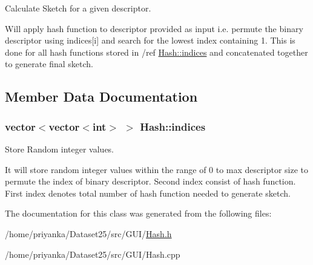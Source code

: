 \-Calculate \-Sketch for a given descriptor. 

\-Will apply hash function to descriptor provided as input i.\-e. permute the binary descriptor using indices\mbox{[}i\mbox{]} and search for the lowest index containing 1. \-This is done for all hash functions stored in /ref \hyperlink{classHash_a312855c01b7618ea56601216467354ee}{\-Hash\-::indices} and concatenated together to generate final sketch. 

\subsection{\-Member \-Data \-Documentation}
\hypertarget{classHash_a312855c01b7618ea56601216467354ee}{
\subsubsection[{indices}]{\setlength{\rightskip}{0pt plus 5cm}vector$<$vector$<$int$>$ $>$ {\bf \-Hash\-::indices}}}\label{classHash_a312855c01b7618ea56601216467354ee}


\-Store \-Random integer values. 

\-It will store random integer values within the range of 0 to max descriptor size to permute the index of binary descriptor. \-Second index consist of hash function. \-First index denotes total number of hash function needed to generate sketch. 

\-The documentation for this class was generated from the following files\-:\begin{DoxyCompactItemize}
\item 
/home/priyanka/\-Dataset25/src/\-G\-U\-I/\hyperlink{Hash_8h}{\-Hash.\-h}\item 
/home/priyanka/\-Dataset25/src/\-G\-U\-I/\-Hash.\-cpp\end{DoxyCompactItemize}
